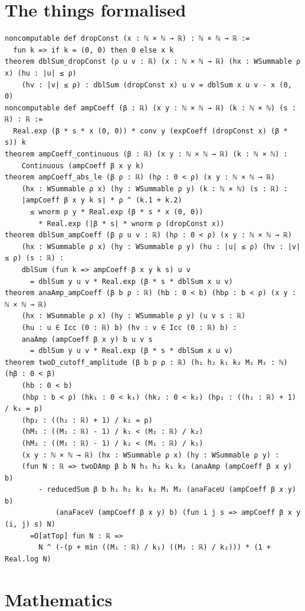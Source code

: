 \documentclass[11pt]{article}
\begin{document}
\section{The things formalised}
{\small
\begin{verbatim}
noncomputable def dropConst (x : ℕ × ℕ → ℝ) : ℕ × ℕ → ℝ :=
  fun k => if k = (0, 0) then 0 else x k
theorem dblSum_dropConst (ρ u v : ℝ) (x : ℕ × ℕ → ℝ) (hx : WSummable ρ x) (hu : |u| ≤ ρ)
    (hv : |v| ≤ ρ) : dblSum (dropConst x) u v = dblSum x u v - x (0, 0)
noncomputable def ampCoeff (β : ℝ) (x y : ℕ × ℕ → ℝ) (k : ℕ × ℕ) (s : ℝ) : ℝ :=
  Real.exp (β * s * x (0, 0)) * conv y (expCoeff (dropConst x) (β * s)) k
theorem ampCoeff_continuous (β : ℝ) (x y : ℕ × ℕ → ℝ) (k : ℕ × ℕ) :
    Continuous (ampCoeff β x y k)
theorem ampCoeff_abs_le (β ρ : ℝ) (hρ : 0 < ρ) (x y : ℕ × ℕ → ℝ)
    (hx : WSummable ρ x) (hy : WSummable ρ y) (k : ℕ × ℕ) (s : ℝ) :
    |ampCoeff β x y k s| * ρ ^ (k.1 + k.2)
      ≤ wnorm ρ y * Real.exp (β * s * x (0, 0))
        * Real.exp (|β * s| * wnorm ρ (dropConst x))
theorem dblSum_ampCoeff (β ρ u v : ℝ) (hρ : 0 < ρ) (x y : ℕ × ℕ → ℝ)
    (hx : WSummable ρ x) (hy : WSummable ρ y) (hu : |u| ≤ ρ) (hv : |v| ≤ ρ) (s : ℝ) :
    dblSum (fun k => ampCoeff β x y k s) u v
      = dblSum y u v * Real.exp (β * s * dblSum x u v)
theorem anaAmp_ampCoeff (β b ρ : ℝ) (hb : 0 < b) (hbρ : b < ρ) (x y : ℕ × ℕ → ℝ)
    (hx : WSummable ρ x) (hy : WSummable ρ y) (u v s : ℝ)
    (hu : u ∈ Icc (0 : ℝ) b) (hv : v ∈ Icc (0 : ℝ) b) :
    anaAmp (ampCoeff β x y) b u v s
      = dblSum y u v * Real.exp (β * s * dblSum x u v)
theorem twoD_cutoff_amplitude (β b p ρ : ℝ) (h₁ h₂ k₁ k₂ M₁ M₂ : ℕ) (hβ : 0 < β)
    (hb : 0 < b)
    (hbρ : b < ρ) (hk₁ : 0 < k₁) (hk₂ : 0 < k₂) (hp₁ : ((h₁ : ℝ) + 1) / k₁ = p)
    (hp₂ : ((h₂ : ℝ) + 1) / k₂ = p)
    (hM₁ : ((M₁ : ℝ) - 1) / k₁ < (M₂ : ℝ) / k₂)
    (hM₂ : ((M₂ : ℝ) - 1) / k₂ < (M₁ : ℝ) / k₁)
    (x y : ℕ × ℕ → ℝ) (hx : WSummable ρ x) (hy : WSummable ρ y) :
    (fun N : ℝ => twoDAmp β b N h₁ h₂ k₁ k₂ (anaAmp (ampCoeff β x y) b)
        - reducedSum β b h₁ h₂ k₁ k₂ M₁ M₂ (anaFaceU (ampCoeff β x y) b)
            (anaFaceV (ampCoeff β x y) b) (fun i j s => ampCoeff β x y (i, j) s) N)
      =O[atTop] fun N : ℝ =>
        N ^ (-(p + min ((M₁ : ℝ) / k₁) ((M₂ : ℝ) / k₂))) * (1 + Real.log N)
\end{verbatim}
}

\section{Mathematics}
\end{document}
